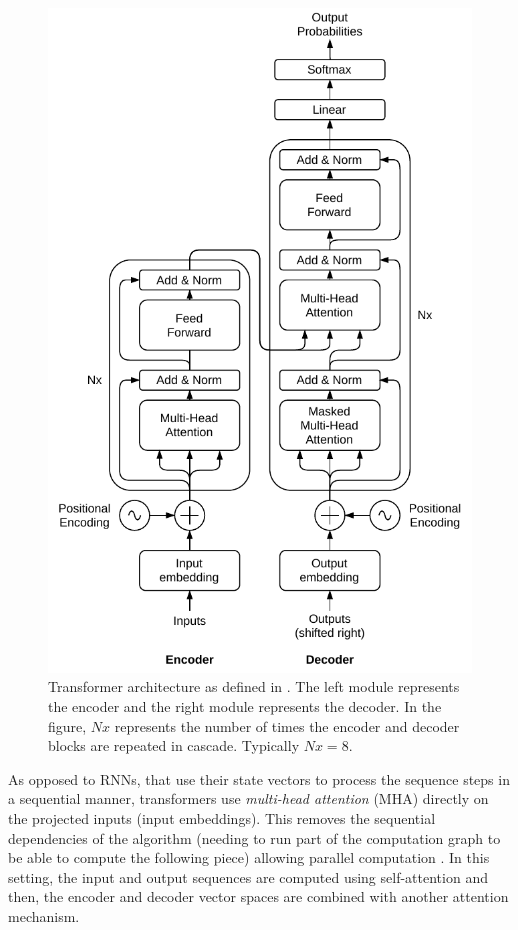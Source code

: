 \begin{figure}
	\centering
	\includegraphics[width=0.8\linewidth]{background/images/transformer}
	\caption[Transformer architecture]{Transformer architecture as defined in \autocite{vaswani2017}. The left module represents the encoder and the right module represents the decoder. In the figure, $Nx$ represents the number of times the encoder and decoder blocks are repeated in cascade. Typically $Nx=8$. }
	\label{fig:transformer}
\end{figure}

As opposed to RNNs, that use their state vectors to process the sequence steps in a sequential manner, transformers use \textit{multi-head attention} (MHA) directly on the projected inputs (input embeddings). This removes the sequential dependencies of the algorithm (needing to run part of the computation graph to be able to compute the following piece) allowing parallel computation \autocite{uday2019}. In this setting, the input and output sequences are computed using self-attention and then, the encoder and decoder vector spaces are combined with another attention mechanism.

